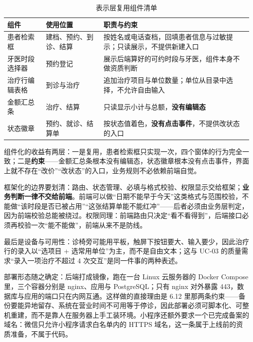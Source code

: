\documentclass[11pt,a4paper]{ctexart}
\begin{document}
\begin{table}[H]
\centering
\caption{表示层复用组件清单}
{\small
\begin{tabularx}{\linewidth}{@{}L{2.9cm}L{4.1cm}X@{}}
\toprule
\textbf{\textcolor{adcblue!92}{组件}} & \textbf{\textcolor{adcblue!92}{使用位置}} & \textbf{\textcolor{adcblue!92}{职责与约束}} \\
\midrule
患者检索框 & 建档、预约、到诊、结算 & 按姓名或电话查档，回填患者信息与过敏提示；只读展示，不提供新建入口 \\
牙医时段选择器 & 预约登记 & 展示后端算好的可约时段与牙医，组件本身不做资质判断 \\
治疗行编辑表格 & 到诊与治疗 & 追加治疗项目与单位数量；单位从目录中选择，不允许自由输入 \\
金额汇总条 & 治疗、结算 & 只读显示小计与总额，\textbf{没有编辑态} \\
状态徽章 & 预约、就诊、结算单 & 按状态值着色，\textbf{没有点击事件}，不提供改状态的入口 \\
\end{tabularx}
}
\end{table}

组件化的收益有两层：一是复用，患者检索框只实现一次，四个窗体的行为完全一致；二是\textbf{约束}——金额汇总条根本没有编辑态，状态徽章根本没有点击事件，界面上就不存在“改价”“改状态”的入口，业务规则不必依赖前端自觉。

框架化的边界要划清：路由、状态管理、必填与格式校验、权限显示交给框架；\textbf{业务判断一律不交给前端}。前端可以做“日期不能早于今天”这类格式与范围校验，不能做“该时段是否已被占用”“这张结算单能不能红冲”——后者必须由业务层判定，因为前端校验总能被绕过。权限同理：前端路由只决定“看不看得到”，后端接口必须再校验一次“能不能做”，前端从来不是防线。

最后是设备与可用性：诊椅旁可能用平板，触屏下按钮要大、输入要少，因此治疗行的录入以“选项目 + 选常用单位”为主，而不是自由文本；这与 UC-03 的质量需求“录入一项治疗不超过 4 次交互”是同一件事的两种表述。

部署形态随之确定：后端打成镜像，跑在一台 Linux 云服务器的 Docker Compose 里，三个容器分别是 nginx、应用与 PostgreSQL；只有 nginx 对外暴露 443，数据库与应用的端口只在内网互通。这样做的直接理由是 6.12 里那两条约束——备份要能异地留存、系统在营业时间不可用等于停诊，因此部署必须可脚本化、可整机重建，而不是靠人在服务器上手工装环境。小程序还额外要求一个已完成备案的域名：微信只允许小程序请求白名单内的 HTTPS 域名，这一条属于上线前的资质准备，不属于代码。
\end{document}
